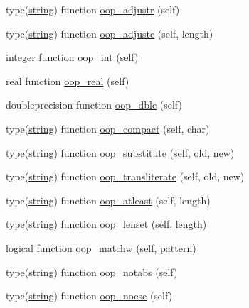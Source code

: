 \begin{DoxyCompactItemize}
\item 
type(\mbox{\hyperlink{structm__strings__oop_1_1string}{string}}) function \mbox{\hyperlink{namespacem__strings__oop_abb0dfa5646259e4fc768700eada111ac}{oop\+\_\+adjustr}} (self)
\item 
type(\mbox{\hyperlink{structm__strings__oop_1_1string}{string}}) function \mbox{\hyperlink{namespacem__strings__oop_a9fa932c23648e737230553a8e7bfb15b}{oop\+\_\+adjustc}} (self, length)
\item 
integer function \mbox{\hyperlink{namespacem__strings__oop_a2092266bec4014f74b8d436c5a8e319f}{oop\+\_\+int}} (self)
\item 
real function \mbox{\hyperlink{namespacem__strings__oop_a9709a714bc825704651b00c7384a7547}{oop\+\_\+real}} (self)
\item 
doubleprecision function \mbox{\hyperlink{namespacem__strings__oop_aa6eaf2b8a12a905d0ebaa21a84871dec}{oop\+\_\+dble}} (self)
\item 
type(\mbox{\hyperlink{structm__strings__oop_1_1string}{string}}) function \mbox{\hyperlink{namespacem__strings__oop_ac02aecbaebcf57833b544de4f50c89a6}{oop\+\_\+compact}} (self, char)
\item 
type(\mbox{\hyperlink{structm__strings__oop_1_1string}{string}}) function \mbox{\hyperlink{namespacem__strings__oop_af653c84bbd0165d1d4a3b61efe0472e8}{oop\+\_\+substitute}} (self, old, new)
\item 
type(\mbox{\hyperlink{structm__strings__oop_1_1string}{string}}) function \mbox{\hyperlink{namespacem__strings__oop_ac88f27671dd1129023494bf2500ca7fd}{oop\+\_\+transliterate}} (self, old, new)
\item 
type(\mbox{\hyperlink{structm__strings__oop_1_1string}{string}}) function \mbox{\hyperlink{namespacem__strings__oop_a3ee018293cef22d7314b2a9f0c78a319}{oop\+\_\+atleast}} (self, length)
\item 
type(\mbox{\hyperlink{structm__strings__oop_1_1string}{string}}) function \mbox{\hyperlink{namespacem__strings__oop_ac8ca18186659b8759b08e5167a3effb5}{oop\+\_\+lenset}} (self, length)
\item 
logical function \mbox{\hyperlink{namespacem__strings__oop_ab88f5f814c08f1c93c95fcd0ba2a6779}{oop\+\_\+matchw}} (self, pattern)
\item 
type(\mbox{\hyperlink{structm__strings__oop_1_1string}{string}}) function \mbox{\hyperlink{namespacem__strings__oop_a5959b2f967a6466c198b39a089ef8a68}{oop\+\_\+notabs}} (self)
\item 
type(\mbox{\hyperlink{structm__strings__oop_1_1string}{string}}) function \mbox{\hyperlink{namespacem__strings__oop_ae1ed148f1ae0694ac093d3e11f9b702b}{oop\+\_\+noesc}} (self)

\end{DoxyCompactItemize}
